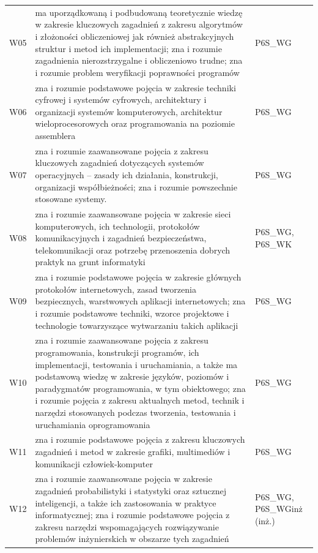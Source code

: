 \documentclass[12pt,a4paper]{article}
\begin{document}
{\begin{longtable}{m{1cm}m{9.5cm}m{3.9cm}}
\rowcolor{tableRowLight} W05 & ma uporządkowaną i podbudowaną teoretycznie wiedzę w zakresie kluczowych zagadnień z zakresu algorytmów i złożoności obliczeniowej jak również abstrakcyjnych struktur i metod ich implementacji; zna i rozumie zagadnienia nierozstrzygalne i obliczeniowo trudne; zna i rozumie problem weryfikacji poprawności programów & {\scriptsize P6S\_WG} \\
\rowcolor{tableRowAlt} W06 & zna i rozumie podstawowe pojęcia w zakresie techniki cyfrowej i systemów cyfrowych, architektury i organizacji systemów komputerowych, architektur wieloprocesorowych oraz programowania na poziomie assemblera & {\scriptsize P6S\_WG} \\
\rowcolor{tableRowLight} W07 & zna i rozumie zaawansowane pojęcia z zakresu kluczowych zagadnień dotyczących systemów operacyjnych -- zasady ich działania, konstrukcji, organizacji współbieżności; zna i rozumie powszechnie stosowane systemy. & {\scriptsize P6S\_WG} \\
\rowcolor{tableRowAlt} W08 & zna i rozumie zaawansowane pojęcia w zakresie sieci komputerowych, ich technologii, protokołów komunikacyjnych i  zagadnień bezpieczeństwa, telekomunikacji oraz potrzebę przenoszenia dobrych praktyk na grunt informatyki & {\scriptsize P6S\_WG, P6S\_WK} \\
\rowcolor{tableRowLight} W09 & zna i rozumie podstawowe pojęcia w zakresie głównych protokołów internetowych, zasad tworzenia bezpiecznych, warstwowych aplikacji internetowych; zna i rozumie podstawowe techniki, wzorce projektowe i technologie towarzyszące wytwarzaniu takich aplikacji & {\scriptsize P6S\_WG} \\
\rowcolor{tableRowAlt} W10 & zna i rozumie zaawansowane pojęcia z zakresu programowania, konstrukcji programów, ich implementacji, testowania i uruchamiania, a także ma podstawową wiedzę w zakresie języków, poziomów i paradygmatów programowania, w tym obiektowego; zna i rozumie pojęcia z zakresu aktualnych metod, technik i narzędzi stosowanych podczas tworzenia, testowania i uruchamiania oprogramowania & {\scriptsize P6S\_WG} \\
\rowcolor{tableRowLight} W11 & zna i rozumie podstawowe pojęcia z zakresu kluczowych zagadnień i metod w zakresie grafiki, multimediów i komunikacji człowiek-komputer & {\scriptsize P6S\_WG} \\
\rowcolor{tableRowAlt} W12 & zna i rozumie zaawansowane pojęcia w zakresie zagadnień probabilistyki i statystyki oraz sztucznej inteligencji, a także ich zastosowania w praktyce informatycznej; zna i rozumie podstawowe pojęcia z zakresu narzędzi wspomagających rozwiązywanie problemów inżynierskich w obszarze tych zagadnień & {\scriptsize P6S\_WG, P6S\_WGinż {\scriptsize (inż.)}} \\

\end{longtable}}
\end{document}
